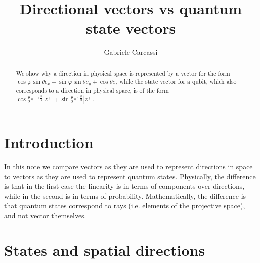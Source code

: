 \documentclass{techbrief}
\title{Directional vectors vs quantum state vectors}
\author{Gabriele Carcassi}
\begin{document}
\maketitle
	
\begin{abstract}
	We show why a direction in physical space is represented by a vector for the form $\cos \varphi \sin \theta e_x + \sin \varphi \sin \theta e_y + \cos \theta e_z$ while the state vector for a qubit, which also corresponds to a direction in physical space, is of the form $\cos \frac{\theta}{2} e^{-\imath \frac{\varphi}{2}} | z^+ \> + \sin \frac{\theta}{2} e^{\imath \frac{\varphi}{2}} | z^+ \>$.
\end{abstract}
	
\section{Introduction}

In this note we compare vectors as they are used to represent directions in space to vectors as they are used to represent quantum states. Physically, the difference is that in the first case the linearity is in terms of components over directions, while in the second is in terms of probability. Mathematically, the difference is that quantum states correspond to rays (i.e. elements of the projective space), and not vector themselves.

\section{States and spatial directions}
\end{document}
